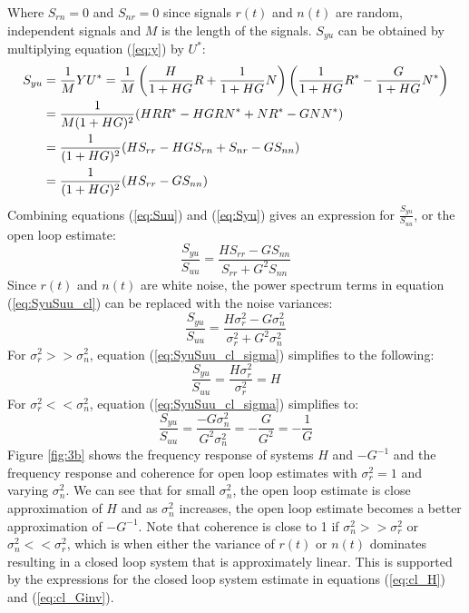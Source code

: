 \documentclass[11pt,a4paper]{article}
\begin{document}
Where $S_{rn} = 0$ and $S_{nr} = 0$ since signals $r(t)$ and $n(t)$ are random,
independent signals and $M$ is the length of the signals. $S_{yu}$ can be
obtained by multiplying equation
(\ref{eq:y}) by $U^*$:
\begin{align}
    S_{yu} &= \frac{1}{M}YU^* =
        \frac{1}{M}\left(\frac{H}{1 + HG}R + \frac{1}{1 + HG}N\right)
        \left(\frac{1}{1 + HG}R^* - \frac{G}{1 + HG}N^*\right) \notag \\
    &= \frac{1}{M(1+HG)^2}(HRR^* - HGRN^* + NR^* - GNN^*) \notag \\
    &= \frac{1}{(1+HG)^2}(HS_{rr} - HGS_{rn} + S_{nr} - GS_{nn}) \notag \\
    &= \frac{1}{(1+HG)^2}(HS_{rr} - GS_{nn}) \label{eq:Syu}
\end{align}
Combining equations (\ref{eq:Suu}) and (\ref{eq:Syu}) gives an expression for
$\frac{S_{yu}}{S_{uu}}$, or the open loop estimate:
\begin{equation}
    \frac{S_{yu}}{S_{uu}} = \frac{HS_{rr} - GS_{nn}}{S_{rr} + G^2S_{nn}}
    \label{eq:SyuSuu_cl}
\end{equation}
Since $r(t)$ and $n(t)$ are white noise, the power spectrum terms in equation
(\ref{eq:SyuSuu_cl}) can be replaced with the noise variances:
\begin{equation}
    \frac{S_{yu}}{S_{uu}} = \frac{H\sigma_r^2 - G\sigma_n^2}
    {\sigma_r^2 + G^2\sigma_n^2}
    \label{eq:SyuSuu_cl_sigma}
\end{equation}
For $\sigma_r^2 >> \sigma_n^2$, equation (\ref{eq:SyuSuu_cl_sigma}) simplifies
to the following:
\begin{equation}
    \frac{S_{yu}}{S_{uu}} = \frac{H\sigma_r^2} {\sigma_r^2} = H \label{eq:cl_H}
\end{equation}
For $\sigma_r^2 << \sigma_n^2$, equation (\ref{eq:SyuSuu_cl_sigma}) simplifies
to:
\begin{equation}
    \frac{S_{yu}}{S_{uu}} = \frac{-G\sigma_n^2} {G^2\sigma_n^2} =
    -\frac{G}{G^2} = -\frac{1}{G} \label{eq:cl_Ginv}
\end{equation}
Figure \ref{fig:3b} shows the frequency response of systems $H$ and $-G^{-1}$
and the frequency response and coherence for open loop estimates with
$\sigma_r^2 = 1$ and varying $\sigma_n^2$. We can see that for small
$\sigma_n^2$, the open loop estimate is close approximation of $H$ and as
$\sigma_n^2$ increases, the open loop estimate becomes a better approximation
of $-G^{-1}$. Note that coherence is close to 1 if $\sigma_n^2 >> \sigma_r^2$
or $\sigma_n^2 << \sigma_r^2$, which is when either the variance of $r(t)$ or
$n(t)$ dominates resulting in a closed loop system that is approximately
linear. This is supported by the expressions for the closed loop system
estimate in equations (\ref{eq:cl_H}) and (\ref{eq:cl_Ginv}).
\end{document}
